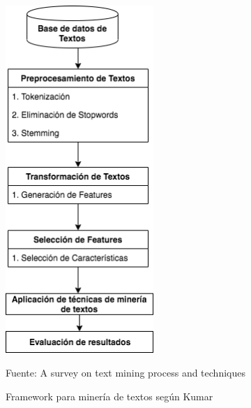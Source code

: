     \begin{figure}[H]
    \centering
    \includegraphics[height=0.7\textheight,width=0.5\textwidth]{figures/Framework_Kumar.png}
    \caption{\label{fig:Framework_Ku} Framework para minería de textos según Kumar} Fuente: A survey on text mining process and techniques \cite{kumar2014survey}
\end{figure}  

